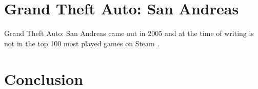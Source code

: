 \documentclass{scrartcl}
\begin{document}
\section{Grand Theft Auto: San Andreas}
Grand Theft Auto: San Andreas came out in 2005 \cite{GTASA} and at the time of writing is not in the top 100 most played games on Steam \cite{STEAMSTATS}.

\section{Conclusion}

\abstract{}
\cite{PMT}



\end{document}
